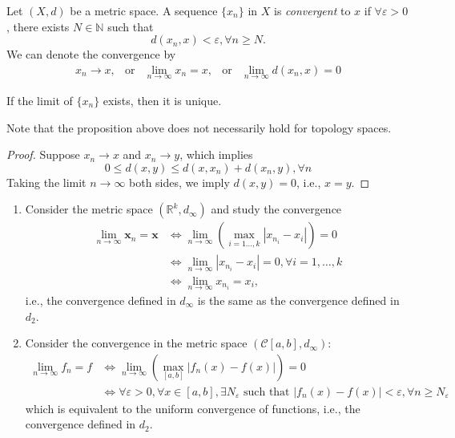 \begin{definition}[Convergence]
Let $(X,d)$ be a metric space. 
A sequence $\{x_n\}$ in $X$ is \emph{convergent} to $x$
if $\forall\varepsilon>0$, there exists $N\in\mathbb{N}$ such that
\[
d(x_n,x)<\varepsilon,\forall n\ge N.
\]
We can denote the convergence by
\[
\begin{array}{lllll}
x_n\to x,
&
\mbox{or}
&
\displaystyle
\lim_{n\to\infty}x_n=x,
&
\mbox{or}
&\displaystyle
\lim_{n\to\infty}d(x_n,x)=0
\end{array}
\]
\end{definition}
\begin{proposition}
If the limit of $\{x_n\}$ exists, then it is unique.
\end{proposition}
\begin{remark}
Note that the proposition above does not necessarily hold for topology spaces.
\end{remark}
\begin{proof}
Suppose $x_n\to x$ and $x_n\to y$, which implies
\[
0\le d(x,y)\le d(x,x_n)+d(x_n,y),\forall n
\]
Taking the limit $n\to\infty$ both sides, we imply $d(x,y)=0$, i.e., $x=y$.
\end{proof}
\begin{example}\label{Exp:1:16}
\begin{enumerate}
\item
Consider the metric space $(\mathbb{R}^k,d_\infty)$ and study the convergence
\begin{align*}
\lim_{n\to\infty}\bm x_n=\bm x&\Longleftrightarrow
\lim_{n\to\infty}\left(\max_{i=1\dots,k}|x_{n_i}-x_i|\right)=0\\
&\Longleftrightarrow
\lim_{n\to\infty}|x_{n_i}-x_i|=0,\forall i=1,\dots,k\\
&\Longleftrightarrow
\lim_{n\to\infty}x_{n_i}=x_i,
\end{align*}
i.e., the convergence defined in $d_\infty$ is the same as the convergence defined in $d_2$.
\item
Consider the convergence in the metric space $(\mathcal{C}[a,b],d_\infty)$:
\begin{align*}
\lim_{n\to\infty}f_n=f&\Longleftrightarrow
\lim_{n\to\infty}\left(\max_{[a,b]}|f_n(x)-f(x)|\right)=0\\
&\Longleftrightarrow
\forall\varepsilon>0,\forall x\in[a,b],\exists N_{\varepsilon}\mbox{ such that }|f_n(x)-f(x)|<\varepsilon,\forall n\ge N_{\varepsilon}
\end{align*}
which is equivalent to the uniform convergence of functions, i.e., the convergence defined in $d_2$.
\end{enumerate}
\end{example}
